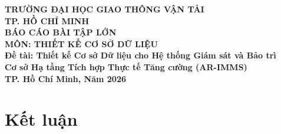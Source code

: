 \documentclass[letterpaper,12pt,leqno]{report}
\begin{document}
\begin{titlepage}
    \centering
    \Large\textbf{TRƯỜNG ĐẠI HỌC GIAO THÔNG VẬN TẢI}\\[0.3cm]
    \Large\textbf{TP. HỒ CHÍ MINH}\\[1.5cm]

    \Huge\textbf{BÁO CÁO BÀI TẬP LỚN}\\[0.5cm]
    \Large\textbf{MÔN: THIẾT KẾ CƠ SỞ DỮ LIỆU}\\[1.5cm]

    \Large\textbf{Đề tài: Thiết kế Cơ sở Dữ liệu cho Hệ thống Giám sát và Bảo trì}\\[0.3cm]
    \Large\textbf{Cơ sở Hạ tầng Tích hợp Thực tế Tăng cường (AR-IMMS)}\\[0.3cm]

    \vfill
    \Large\textbf{TP. Hồ Chí Minh, Năm 2026}
\end{titlepage}

\cleardoublepage
{}

\tableofcontents
\cleardoublepage




\cleardoublepage







\cleardoublepage


\chapter*{Kết luận}

\cleardoublepage
\end{document}
